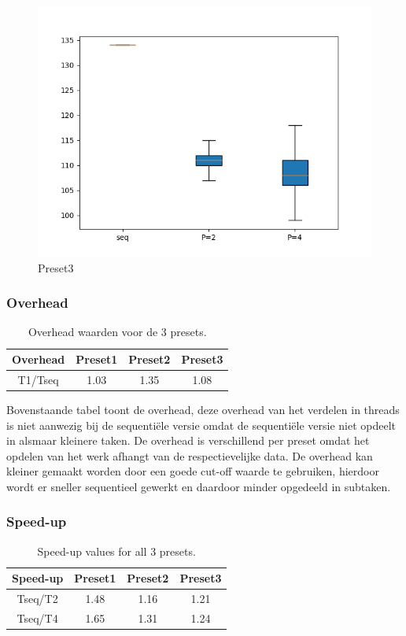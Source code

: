 \documentclass[]{article}
\begin{document}
\begin{figure}
	\centering
	\includegraphics[width=0.7\linewidth]{Preset_3}
	\caption[Preset1]{Preset3}
	\label{fig:preset3}
\end{figure}

\subsubsection{Overhead}

\begin{table}[h!]
	\centering
\begin{tabular}{|c|c|c|c|}
	\hline 
	Overhead & Preset1 & Preset2 & Preset3 \\ 
	\hline 
	T1/Tseq & 1.03 & 1.35 & 1.08 \\ 
	\hline 
\end{tabular} 
\caption{Overhead waarden voor de 3 presets.}
\label{table:2}
\end{table}

Bovenstaande tabel toont de overhead, deze overhead van het verdelen in threads is niet aanwezig bij de sequentiële versie omdat de sequentiële versie niet opdeelt in alsmaar kleinere taken. De overhead is verschillend per preset omdat het opdelen van het werk afhangt van de respectievelijke data.
De overhead kan kleiner gemaakt worden door een goede cut-off waarde te gebruiken, hierdoor wordt er sneller sequentieel gewerkt en daardoor minder opgedeeld in subtaken.

\subsubsection{Speed-up}
\begin{table}[h!]
	\centering
	\begin{tabular}{|c|c|c|c|}
		\hline 
		Speed-up & Preset1 & Preset2 & Preset3 \\ 
		\hline 
		Tseq/T2 & 1.48 & 1.16 & 1.21 \\ 
		\hline 
		\hline 
		Tseq/T4 & 1.65 & 1.31 & 1.24 \\ 
		\hline 
	\end{tabular} 
	\caption{Speed-up values for all 3 presets.}
	\label{table:2}
\end{table}
\end{document}

